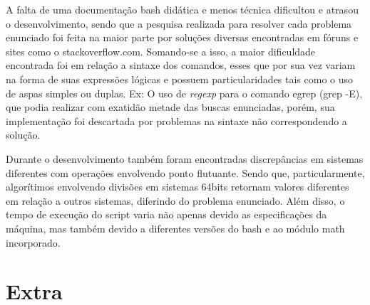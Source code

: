 \documentclass[12pt]{article}
\begin{document}
A falta de uma documentação bash didática e menos técnica dificultou e atrasou o desenvolvimento, sendo que a pesquisa realizada para resolver cada problema enunciado  foi feita na maior parte por soluções diversas encontradas em fóruns e sites como o stackoverflow.com. Somando-se a isso, a maior dificuldade encontrada foi em relação a sintaxe dos comandos, esses que por sua vez variam na forma de suas expressões lógicas e possuem particularidades tais como o uso de aspas simples ou duplas. Ex: O uso de \textit{regexp} para o comando egrep (grep -E), que podia realizar com exatidão metade das buscas enunciadas, porém, sua implementação foi descartada por problemas na sintaxe não correspondendo a solução.

Durante o desenvolvimento também foram encontradas discrepâncias em sistemas diferentes com operações envolvendo ponto flutuante. Sendo que, particularmente, algorítimos envolvendo divisões em sistemas 64bits retornam valores diferentes em relação a outros sistemas, diferindo do problema enunciado. Além disso, o tempo de execução do script varia não apenas devido as especificações da máquina, mas também devido a diferentes versões do bash e ao módulo math incorporado.

\pagebreak

\section{Extra}
\end{document}
